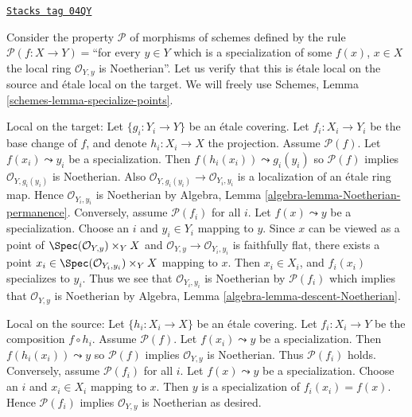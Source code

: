 \begin{example}
\label{descent-example-silly-two}
\href{https://stacks.math.columbia.edu/tag/04QY}{\texttt{Stacks tag 04QY}}

Consider the property $\mathcal{P}$ of morphisms of schemes defined
by the rule $\mathcal{P}(f : X \to Y) = $``for every $y \in Y$ which is
a specialization of some $f(x)$, $x \in X$ the local ring
$\mathcal{O}_{Y, y}$ is Noetherian''. Let us verify that this is
\'etale local on the source and \'etale local on the target. We will freely use
Schemes, Lemma \ref{schemes-lemma-specialize-points}.

\medskip\noindent
Local on the target:
Let $\{g_i : Y_i \to Y\}$ be an \'etale covering. Let $f_i : X_i \to Y_i$
be the base change of $f$, and denote $h_i : X_i \to X$ the projection.
Assume $\mathcal{P}(f)$. Let $f(x_i) \leadsto y_i$
be a specialization. Then $f(h_i(x_i)) \leadsto g_i(y_i)$ so
$\mathcal{P}(f)$ implies $\mathcal{O}_{Y, g_i(y_i)}$ is Noetherian.
Also $\mathcal{O}_{Y, g_i(y_i)} \to \mathcal{O}_{Y_i, y_i}$ is a
localization of an \'etale ring map.
Hence $\mathcal{O}_{Y_i, y_i}$ is Noetherian by
Algebra, Lemma \ref{algebra-lemma-Noetherian-permanence}.
Conversely, assume $\mathcal{P}(f_i)$ for all $i$. Let $f(x) \leadsto y$
be a specialization. Choose an $i$ and $y_i \in Y_i$ mapping to $y$.
Since $x$ can be viewed as a point of
$\Spec(\mathcal{O}_{Y, y}) \times_Y X$ and
$\mathcal{O}_{Y, y} \to \mathcal{O}_{Y_i, y_i}$ is faithfully flat,
there exists a point
$x_i \in \Spec(\mathcal{O}_{Y_i, y_i}) \times_Y X$
mapping to $x$. Then $x_i \in X_i$, and $f_i(x_i)$ specializes to $y_i$.
Thus we see that $\mathcal{O}_{Y_i, y_i}$ is Noetherian by
$\mathcal{P}(f_i)$ which implies that $\mathcal{O}_{Y, y}$ is
Noetherian by
Algebra, Lemma \ref{algebra-lemma-descent-Noetherian}.

\medskip\noindent
Local on the source:
Let $\{h_i : X_i \to X\}$ be an \'etale covering. Let $f_i : X_i \to Y$
be the composition $f \circ h_i$. Assume $\mathcal{P}(f)$. Let
$f(x_i) \leadsto y$ be a specialization. Then $f(h_i(x_i)) \leadsto y$ so
$\mathcal{P}(f)$ implies $\mathcal{O}_{Y, y}$ is Noetherian. Thus
$\mathcal{P}(f_i)$ holds.
Conversely, assume $\mathcal{P}(f_i)$ for all $i$. Let $f(x) \leadsto y$
be a specialization. Choose an $i$ and $x_i \in X_i$ mapping to $x$.
Then $y$ is a specialization of $f_i(x_i) = f(x)$. Hence
$\mathcal{P}(f_i)$ implies $\mathcal{O}_{Y, y}$ is Noetherian
as desired.


\end{example}
